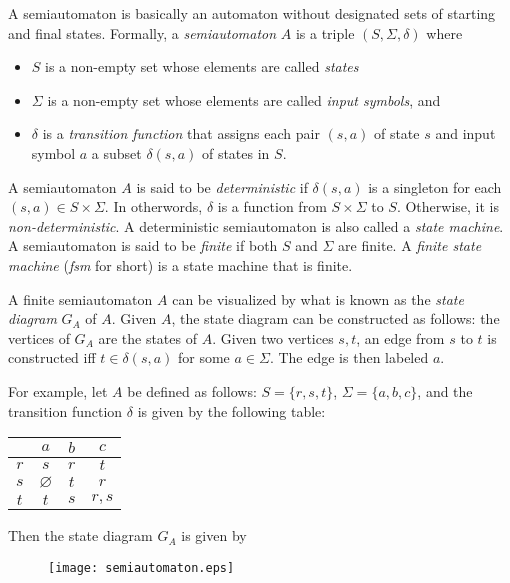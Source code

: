 \documentclass[12pt]{article}
\begin{document}
A semiautomaton is basically an automaton without designated sets of starting and final states.  Formally, a \emph{semiautomaton} $A$ is a triple $(S,\Sigma,\delta)$ where
\begin{itemize}
\item $S$ is a non-empty set whose elements are called \emph{states}
\item $\Sigma$ is a non-empty set whose elements are called \emph{input symbols}, and
\item $\delta$ is a \emph{transition function} that assigns each pair $(s,a)$ of state $s$ and input symbol $a$ a subset $\delta(s,a)$ of states in $S$. 
\end{itemize}
A semiautomaton $A$ is said to be \emph{deterministic} if $\delta(s,a)$ is a singleton for each $(s,a)\in S\times \Sigma$.   In otherwords, $\delta$ is a function from $S\times \Sigma$ to $S$.  Otherwise, it is \emph{non-deterministic}.  A deterministic semiautomaton is also called a \emph{state machine}.  A semiautomaton is said to be \emph{finite} if both $S$ and $\Sigma$ are finite.  A \emph{finite state machine} (\emph{fsm} for short) is a state machine that is finite.

A finite semiautomaton $A$ can be visualized by what is known as the \emph{state diagram} $G_A$ of $A$.  Given $A$, the state diagram can be constructed as follows: the vertices of $G_A$ are the states of $A$.  Given two vertices $s,t$, an edge from $s$ to $t$ is constructed iff $t\in \delta(s,a)$ for some $a\in \Sigma$.  The edge is then labeled $a$.

For example, let $A$ be defined as follows: $S=\lbrace r,s,t\rbrace$, $\Sigma = \lbrace a, b, c\rbrace$, and the transition function $\delta$ is given by the following table:
\begin{center}
\begin{tabular}{|c||c|c|c|}
\hline
& $a$ & $b$ & $c$ \\
\hline\hline
$r$ & $s$ & $r$ & $t$  \\
\hline
$s$ & $\varnothing$ & $t$ & $r$  \\
\hline
$t$ & $t$ & $s$ & $r,s$  \\
\hline
\end{tabular}
\end{center}
Then the state diagram $G_A$ is given by
\begin{figure}[htp]
\centering
\texttt{[image: semiautomaton.eps]}
\end{figure}
\end{document}
